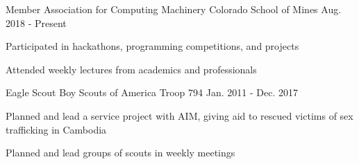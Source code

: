

\begin{cventries}
  \cventry
    {Member}
    {Association for Computing Machinery}
    {Colorado School of Mines}
    {Aug. 2018 - Present}
    {
      \begin{cvitems}
        \item{Participated in hackathons, programming competitions, and projects}
        \item{Attended weekly lectures from academics and professionals}
      \end{cvitems}
    }

  \cventry
    {Eagle Scout}
    {Boy Scouts of America}
    {Troop 794}
    {Jan. 2011 - Dec. 2017}
    {
      \begin{cvitems}
        \item{Planned and lead a service project with AIM, giving aid to rescued victims of sex trafficking in Cambodia}
        \item{Planned and lead groups of scouts in weekly meetings}
      \end{cvitems}
    }
\end{cventries}
